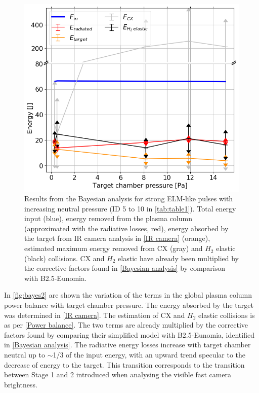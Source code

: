 \begin{figure}
        \centering
    	\includegraphics[width=0.7\linewidth,trim={0 0 0 5},clip]{Chapters/chapter3/figs/bayesian_strong_3b.png}
	\caption{Results from the Bayesian analysis for strong ELM-like pulses with increasing neutral pressure (ID 5 to 10 in \autoref{tab:table1}). Total energy input (blue), energy removed from the plasma column (approximated with the radiative losses, red), energy absorbed by the target from IR camera analysis in \autoref{IR camera} (orange), estimated maximum energy removed from CX (gray) and $H_2$ elastic (black) collisions. CX and $H_2$ elastic have already been multiplied by the corrective factors found in \autoref{Bayesian analysis} by comparison with B2.5-Eunomia.}
	\label{fig:bayes2}
\end{figure}

In \autoref{fig:bayes2} are shown the variation of the terms in the global plasma column power balance with target chamber pressure. The energy absorbed by the target was determined in \autoref{IR camera}. The estimation of CX and $H_2$ elastic collisions is as per \autoref{Power balance}. The two terms are already multiplied by the corrective factors found by comparing their simplified model with B2.5-Eunomia, identified in \autoref{Bayesian analysis}. The radiative energy losses increase with target chamber neutral up to $\sim$1/3 of the input energy, with an upward trend specular to the decrease of energy to the target. This transition corresponds to the transition between Stage 1 and 2 introduced when analysing the visible fast camera brightness.

